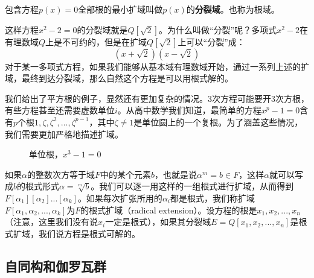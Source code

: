 \documentclass[b5paper]{ctexart}
\begin{document}
 
\begin{definition}
包含方程$p(x) = 0$全部根的最小扩域叫做$p(x)$的\textbf{分裂域}。也称为根域。
\end{definition}

这样方程$x^2 -2 = 0$的分裂域就是$Q[\sqrt{2}]$。为什么叫做“分裂”呢？多项式$x^2-2$在有理数域$Q$上是不可约的，但是在扩域$Q[\sqrt{2}]$上可以“分裂”成：
\[
(x + \sqrt{2}) (x - \sqrt{2})
\]
对于某一多项式方程，如果我们能够从基本域有理数域开始，通过一系列上述的扩域，最终到达分裂域，那么自然这个方程是可以用根式解的。

我们给出了平方根的例子，显然还有更加复杂的情况。3次方程可能要开3次方根，有些方程甚至还需要虚数单位$i$。从高中数学我们知道，最简单的方程$x^p-1=0$含有$p$个根$1, \zeta, \zeta^2, ..., \zeta^{p-1}$，其中$\zeta \neq 1$是单位圆上的一个复根。为了涵盖这些情况，我们需要更加严格地描述扩域。

\begin{figure}[htbp]
\centering
{}
\caption{单位根，$x^3 - 1 = 0$}
\label{fig:root-of-unity}
\end{figure}

如果$\alpha$的整数次方等于域$F$中的某个元素$b$，也就是说$\alpha^m = b \in F$，这样$\alpha$就可以写成$b$的根式形式$\alpha = \sqrt[m]{b}$。我们可以逐一用这样的一组根式进行扩域，从而得到$F[\alpha_1][\alpha_2]...[\alpha_k]$。如果每次扩张所用的$\alpha_i$都是根式，我们称扩域$F[\alpha_1, \alpha_2, ..., \alpha_k]$为$F$的根式扩域（radical extension）。设方程的根是$x_1, x_2, ..., x_n$（注意，这里我们没有说$x_i$一定是根式），如果其分裂域$E = Q[x_1, x_2, ..., x_n]$是根式扩域，我们说方程是根式可解的。

\begin{Exercise}
\end{Exercise}

\subsection{自同构和伽罗瓦群}
\end{document}
